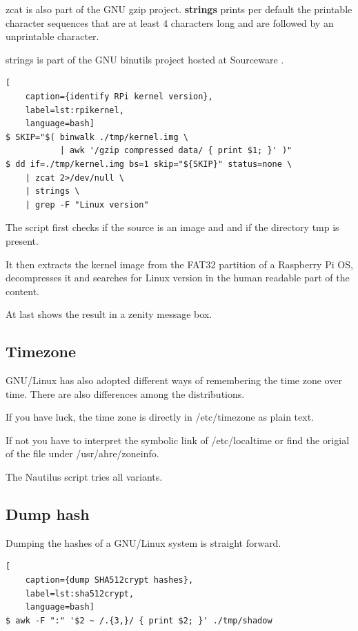 zcat is also part of the GNU gzip project.\newline
\newline
\noindent \textbf{strings} prints per default the printable character sequences that are at least 4 characters long and are followed by an unprintable character.

strings is part of the GNU binutils project hosted at Sourceware \cite{Binutils}.

\begin{lstlisting}[
    caption={identify RPi kernel version},
    label=lst:rpikernel,
    language=bash]
$ SKIP="$( binwalk ./tmp/kernel.img \
           | awk '/gzip compressed data/ { print $1; }' )"
$ dd if=./tmp/kernel.img bs=1 skip="${SKIP}" status=none \
    | zcat 2>/dev/null \
    | strings \
    | grep -F "Linux version"
\end{lstlisting}

\noindent The script first checks if the source is an image and and if the directory tmp is present.

It then extracts the kernel image from the FAT32 partition of a Raspberry Pi OS, decompresses it and searches for \glqq{}Linux version\grqq{} in the human readable part of the content.

At last shows the result in a zenity message box.

\subsection{Timezone}

GNU/Linux has also adopted different ways of remembering the time zone over time. There are also differences among the distributions.

If you have luck, the time zone is directly in /etc/timezone as plain text.

If not you have to interpret the symbolic link of /etc/localtime or find the origial of the file under /usr/ahre/zoneinfo.

The Nautilus script tries all variants.

\subsection{Dump hash}

Dumping the hashes of a GNU/Linux system is straight forward.

\begin{lstlisting}[
    caption={dump SHA512crypt hashes},
    label=lst:sha512crypt,
    language=bash]
$ awk -F ":" '$2 ~ /.{3,}/ { print $2; }' ./tmp/shadow
\end{lstlisting}

